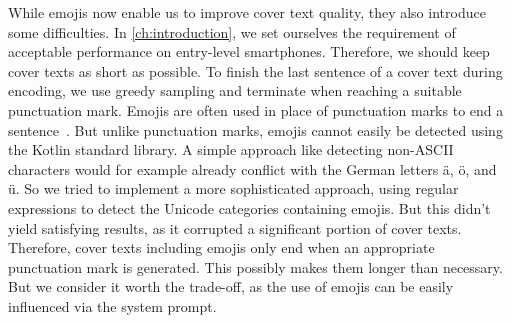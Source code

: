 While emojis now enable us to improve cover text quality, they also introduce some difficulties. In \cref{ch:introduction}, we set ourselves the requirement of acceptable performance on entry-level smartphones. Therefore, we should keep cover texts as short as possible. To finish the last sentence of a cover text during encoding, we use greedy sampling and terminate when reaching a suitable punctuation mark. Emojis are often used in place of punctuation marks to end a sentence~\cite{zhouGoodbyeTextHello2017}. But unlike punctuation marks, emojis cannot easily be detected using the Kotlin standard library. A simple approach like detecting non-ASCII characters would for example already conflict with the German letters ä, ö, and ü. So we tried to implement a more sophisticated approach, using regular expressions to detect the Unicode categories containing emojis. But this didn't yield satisfying results, as it corrupted a significant portion of cover texts. Therefore, cover texts including emojis only end when an appropriate punctuation mark is generated. This possibly makes them longer than necessary. But we consider it worth the trade-off, as the use of emojis can be easily influenced via the system prompt.
